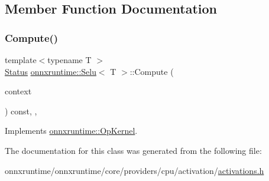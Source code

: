 \subsection{Member Function Documentation}
\mbox{\label{classonnxruntime_1_1Selu_a05cc73e0b910439864ba33b66537ca6e}} 
\subsubsection{\texorpdfstring{Compute()}{Compute()}}
{\footnotesize\ttfamily template$<$typename T $>$ \\
\mbox{\hyperlink{classonnxruntime_1_1common_1_1Status}{Status}} \mbox{\hyperlink{classonnxruntime_1_1Selu}{onnxruntime\+::\+Selu}}$<$ T $>$\+::Compute (\begin{DoxyParamCaption}\item[{\mbox{\hyperlink{classonnxruntime_1_1OpKernelContext}{Op\+Kernel\+Context}} $\ast$}]{context }\end{DoxyParamCaption}) const\hspace{0.3cm}{\ttfamily [inline]}, {\ttfamily [override]}, {\ttfamily [virtual]}}



Implements \mbox{\hyperlink{classonnxruntime_1_1OpKernel_a9eca8656a78b1b3ab9d3351a12798650}{onnxruntime\+::\+Op\+Kernel}}.



The documentation for this class was generated from the following file\+:\begin{DoxyCompactItemize}
\item 
onnxruntime/onnxruntime/core/providers/cpu/activation/\mbox{\hyperlink{cpu_2activation_2activations_8h}{activations.\+h}}\end{DoxyCompactItemize}
